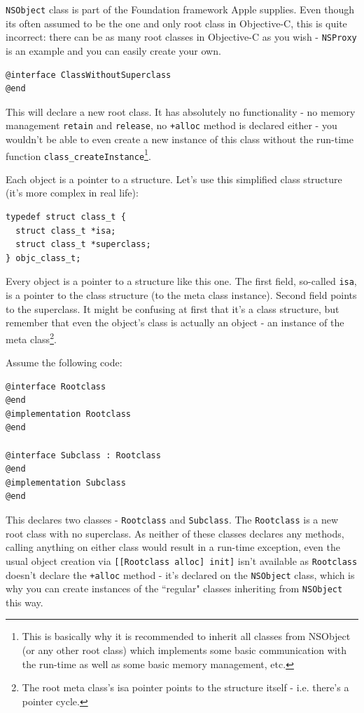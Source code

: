 \documentclass[a4paper, 11pt, fleqn]{book}
\begin{document}
\verb=NSObject= class is part of the Foundation framework Apple supplies. Even though its often assumed to be the one and only root class in Objective-C, this is quite incorrect: there can be as many root classes in Objective-C as you wish - \verb=NSProxy= is an example and you can easily create your own.

\begin{verbatim}@interface ClassWithoutSuperclass
@end\end{verbatim}

This will declare a new root class. It has absolutely no functionality - no memory management \verb=retain= and \verb=release=, no \verb=+alloc= method is declared either - you wouldn't be able to even create a new instance of this class without the run-time function \verb=class_createInstance=\footnote{This is basically why it is recommended to inherit all classes from NSObject (or any other root class) which implements some basic communication with the run-time as well as some basic memory management, etc.}.

Each object is a pointer to a structure. Let's use this simplified class structure (it's more complex in real life):

\begin{verbatim}
typedef struct class_t {
  struct class_t *isa;
  struct class_t *superclass;
} objc_class_t;
\end{verbatim}

Every object is a pointer to a structure like this one. The first field, so-called \verb=isa=, is a pointer to the class structure (to the meta class instance). Second field points to the superclass. It might be confusing at first that it's a class structure, but remember that even the object's class is actually an object - an instance of the meta class\footnote{The root meta class's isa pointer points to the structure itself - i.e. there's a pointer cycle.}.

Assume the following code:
\begin{verbatim}@interface Rootclass
@end
@implementation Rootclass
@end

@interface Subclass : Rootclass
@end
@implementation Subclass
@end 
\end{verbatim}

This declares two classes - \verb=Rootclass= and \verb=Subclass=. The \verb=Rootclass= is a new root class with no superclass. As neither of these classes declares any methods, calling anything on either class would result in a run-time exception, even the usual object creation via \verb=[[Rootclass alloc] init]= isn't available as \verb=Rootclass= doesn't declare the \verb=+alloc= method - it's declared on the \verb=NSObject= class, which is why you can create instances of the ``regular" classes inheriting from \verb=NSObject= this way.
\end{document}
